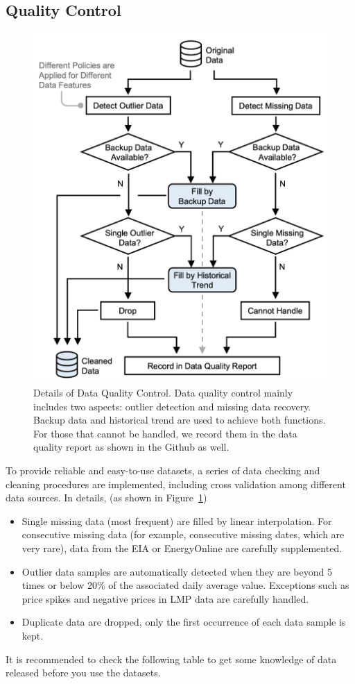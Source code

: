 \documentclass[10pt]{article}
\numberwithin{equation}{section}
\numberwithin{table}{section}
\numberwithin{figure}{section}
\begin{document}
\subsection{Quality Control}
\begin{figure}[htbp]
	\centering
	\includegraphics[width=.8\textwidth]{figures/data-quality-control.png}
	\caption{Details of Data Quality Control. Data quality control mainly includes two aspects: outlier detection and missing data recovery. Backup data and historical trend are used to achieve both functions. For those that cannot be handled, we record them in the data quality report as shown in the Github as well.}
	\label{fig:dataqualitycontrol}
\end{figure}
To provide reliable and easy-to-use datasets, a series of data checking and cleaning procedures are implemented, including cross validation	among different data sources. 
In details, (as shown in Figure~\ref{fig:dataqualitycontrol})
\begin{itemize}
	\item Single missing data (most frequent) are filled by linear interpolation. For consecutive missing data (for example, consecutive missing dates, which are very rare), data from the EIA or EnergyOnline are carefully supplemented.
	\item Outlier data samples are automatically detected when they are beyond 5 times or below 20\% of the associated daily average value. Exceptions such as price spikes and negative prices in LMP data are carefully handled.
	\item Duplicate data are dropped, only the first occurrence of each data sample is kept.
\end{itemize}
It is recommended to check the following table to get some knowledge of data released before you use the datasets.
\end{document}
